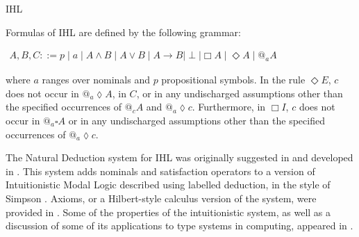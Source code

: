 \begin{entry}{IHL}
\begin{clarifications}
  Formulas of IHL are defined by the following grammar:
  \begin{center} 
    \begin{math}
      \begin{array}{lll}
        A,B,C ::= p \mid a \mid A \land B \mid A \lor B \mid A \rightarrow B \mid \perp \mid \Box A \mid \Diamond A \mid @_a A
      \end{array}
    \end{math}
  \end{center}
  where $a$ ranges over nominals and $p$ propositional symbols. In the
  rule $\Diamond E$, $c$ does not occur in $@_a \lozenge A $, in $C$,
  or in any undischarged assumptions other than the specified
  occurrences of $@_c A$ and $@_a \lozenge c $.  Furthermore, in $\Box
  I$, $c$ does not occur in $@_a \square A $ or in any undischarged
  assumptions other than the specified occurrences of $@_a \lozenge c$.
\end{clarifications}

\begin{history}
The Natural Deduction system for IHL was originally suggested in
\cite{braunerdepaiva2003} and developed in \cite{braunerdepaiva2006}.
This system adds nominals and satisfaction operators to a version of
Intuitionistic Modal Logic described using labelled deduction, in the
style of Simpson \cite{simpson1994}.  Axioms, or a Hilbert-style
calculus version of the system, were provided in \cite{brauner2006}.
Some of the properties of the intuitionistic system, as well as a
discussion of some of its applications to type systems in computing,
appeared in \cite{brauner2011}.
\end{history}


\end{entry}
